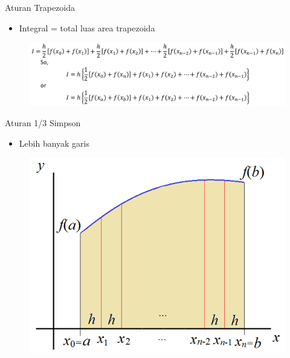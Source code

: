\documentclass[pdflatex,compress,mathserif]{beamer}
\begin{document}
\begin{frame}{Aturan Trapezoida}
    \begin{itemize}
        \item Integral = total luas area trapezoida
    \end{itemize}
    \begin{figure}
        \centering
        \includegraphics[width=\linewidth]{./img/img04.png}
    \end{figure}
\end{frame}

\begin{frame}{Aturan 1/3 Simpson}
    \begin{itemize}
        \item Lebih banyak garis
    \end{itemize}
    \begin{figure}
        \centering
        \includegraphics[width=0.6\linewidth]{./img/img05.png}
    \end{figure}
\end{frame}
\end{document}
